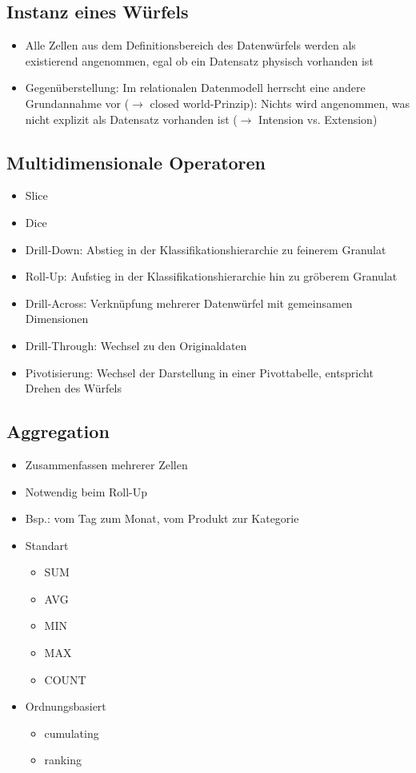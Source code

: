 \subsection{Instanz eines Würfels}
\begin{itemize}
	\item Alle Zellen aus dem Definitionsbereich des Datenwürfels werden als existierend angenommen, egal ob ein Datensatz physisch vorhanden ist
	\item Gegenüberstellung: Im relationalen Datenmodell herrscht eine andere Grundannahme vor ($\rightarrow$ \glqq{}closed world\grqq{}-Prinzip): Nichts wird angenommen, was nicht explizit als Datensatz vorhanden ist ($\rightarrow$ \glqq{}Intension vs. Extension\grqq{})
\end{itemize}
\subsection{Multidimensionale Operatoren}
\begin{itemize}
	\item Slice
	\item Dice
	\item Drill-Down: Abstieg in der Klassifikationshierarchie zu feinerem Granulat
	\item Roll-Up: Aufstieg in der Klassifikationshierarchie hin zu gröberem Granulat
	\item Drill-Across: Verknüpfung mehrerer Datenwürfel mit gemeinsamen Dimensionen
	\item Drill-Through: Wechsel zu den Originaldaten
	\item Pivotisierung: Wechsel der Darstellung in einer Pivottabelle, entspricht Drehen des Würfels
\end{itemize}
\subsection{Aggregation}
\begin{itemize}
	\item Zusammenfassen mehrerer Zellen
	\item Notwendig beim Roll-Up
	\item Bsp.: vom Tag zum Monat, vom Produkt zur Kategorie
	\item Standart
		\begin{itemize}
			\item SUM
			\item AVG
			\item MIN
			\item MAX
			\item COUNT
		\end{itemize}
	\item Ordnungsbasiert
		\begin{itemize}
			\item cumulating
			\item ranking
		\end{itemize}
\end{itemize}
